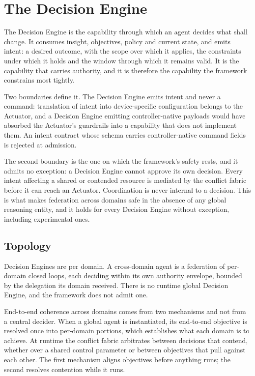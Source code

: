 
\hypertarget{the-decision-engine}{%
\section{The Decision Engine}\label{the-decision-engine}}

The Decision Engine is the capability through which an agent decides
what shall change. It consumes insight, objectives, policy and current
state, and emits intent: a desired outcome, with the scope over which it
applies, the constraints under which it holds and the window through
which it remains valid. It is the capability that carries authority, and
it is therefore the capability the framework constrains most tightly.

Two boundaries define it. The Decision Engine emits intent and never a
command: translation of intent into device-specific configuration
belongs to the Actuator, and a Decision Engine emitting
controller-native payloads would have absorbed the Actuator's guardrails
into a capability that does not implement them. An intent contract whose
schema carries controller-native command fields is rejected at
admission.

The second boundary is the one on which the framework's safety rests,
and it admits no exception: a Decision Engine cannot approve its own
decision. Every intent affecting a shared or contended resource is
mediated by the conflict fabric before it can reach an Actuator.
Coordination is never internal to a decision. This is what makes
federation across domains safe in the absence of any global reasoning
entity, and it holds for every Decision Engine without exception,
including experimental ones.

\hypertarget{topology}{%
\subsection{Topology}\label{topology}}

Decision Engines are per domain. A cross-domain agent is a federation of
per-domain closed loops, each deciding within its own authority
envelope, bounded by the delegation its domain received. There is no
runtime global Decision Engine, and the framework does not admit one.

End-to-end coherence across domains comes from two mechanisms and not
from a central decider. When a global agent is instantiated, its
end-to-end objective is resolved once into per-domain portions, which
establishes what each domain is to achieve. At runtime the conflict
fabric arbitrates between decisions that contend, whether over a shared
control parameter or between objectives that pull against each other.
The first mechanism aligns objectives before anything runs; the second
resolves contention while it runs.

